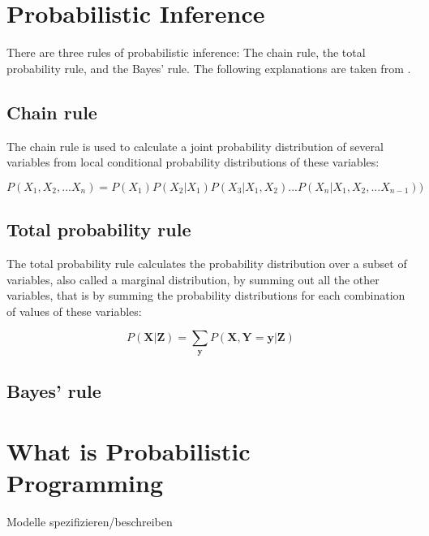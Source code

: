 \documentclass{article}
\begin{document}

\printglossaries
\section{Probabilistic Inference}

There are three rules of probabilistic inference: The chain rule, the total probability rule, and the Bayes' rule. The following explanations are taken from \cite{9781617292330}.

\subsection{Chain rule}

The chain rule is used to calculate a \gls{joint probability distribution} of several variables from local \gls{conditional probability distribution}s of these variables:

\begin{equation}
  P(X_1 ,X_2 ,...X_n ) = P(X_1 )P(X_2 | X_1 )P(X_3 | X_1 ,X_2 )...P(X_n | X_1 ,X_2 ,...X_{n-1}) )
\end{equation}

\subsection{Total probability rule}

The total probability rule calculates the probability distribution over a subset of variables, also called a \gls{marginal distribution}, by summing out all the other variables, that is by summing the probability distributions for each combination of values of these variables:

\begin{equation}
P(\boldsymbol X |\boldsymbol Z ) = \sum_{\boldsymbol y}   P(\boldsymbol X ,\boldsymbol Y =\boldsymbol y |\boldsymbol Z )
\end{equation} 

\subsection{Bayes' rule}

\section{What is Probabilistic Programming}

Modelle spezifizieren/beschreiben

\cite{wiki:Probabilisticprogramminglanguage}
\end{document}
